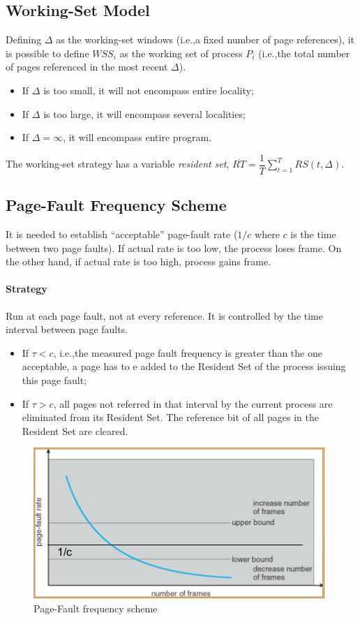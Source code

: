 \subsection{Working-Set Model}
Defining $\Delta$ as the working-set windows (i.e.,\@ a fixed number of page references), it is possible to define ${WSS}_i$ as the working set of process $P_{i}$ (i.e.,\@ the total number of pages referenced in the most recent $\Delta$).
\begin{itemize}
\item If $\Delta$ is too small, it will not encompass entire locality;
\item If $\Delta$ is too large, it will encompass several localities;
\item If $\Delta = \infty$, it will encompass entire program.
\end{itemize}
The working-set strategy has a variable \emph{resident set}, $\overline{RT} = \dfrac{1}{T} \sum_{t=1}^T RS(t,\Delta)$.

\subsection{Page-Fault Frequency Scheme}
It is needed to establish ``acceptable'' page-fault rate ($1/c$ where $c$ is the time between two page faults). If actual rate is too low, the process loses frame. On the other hand, if actual rate is too high, process gains frame.

\paragraph{Strategy}
Run at each page fault, not at every reference. It is controlled by the time interval between page faults.
\begin{itemize}
\item If $\tau < c$, i.e.,\@ the measured page fault frequency is greater than the one acceptable, a page has to e added to the Resident Set of the process issuing this page fault;
\item If $\tau > c$, all pages not referred in that interval by the current process are eliminated from its Resident Set. The reference bit of all pages in the Resident Set are cleared.
\end{itemize}

\begin{figure}[hbtp]
\centering
\includegraphics[scale=0.6]{images/virtual_memory/page_fault_frequency.jpg}
\caption{Page-Fault frequency scheme}
\end{figure}

